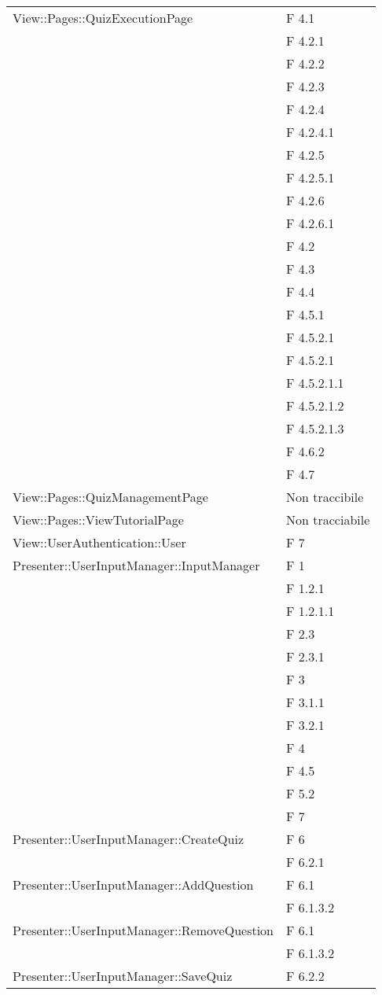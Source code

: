 \begin{longtable}{p{}p{}}
\midrule
View::Pages::QuizExecutionPage
								& F 4.1\\
								& F 4.2.1\\
								& F 4.2.2\\
								& F 4.2.3\\
								& F 4.2.4\\
								& F 4.2.4.1\\
								& F 4.2.5\\
								& F 4.2.5.1\\
								& F 4.2.6\\
								& F 4.2.6.1\\
								& F 4.2\\
								& F 4.3\\
								& F 4.4\\
								& F 4.5.1\\
								& F 4.5.2.1\\
								& F 4.5.2.1\\
								& F 4.5.2.1.1\\
								& F 4.5.2.1.2\\
								& F 4.5.2.1.3\\
								& F 4.6.2\\
								& F 4.7\\
\midrule
View::Pages::QuizManagementPage	& Non traccibile\\
\midrule
View::Pages::ViewTutorialPage	& Non tracciabile\\
\midrule
View::UserAuthentication::User	& F 7\\
\midrule
Presenter::UserInputManager::InputManager	& F 1\\
											& F 1.2.1\\
											& F 1.2.1.1\\
											& F 2.3\\
											& F 2.3.1\\
											& F 3\\
											& F 3.1.1\\
											& F 3.2.1\\
											& F 4\\
											& F 4.5\\
											& F 5.2\\
											& F 7\\
\midrule

Presenter::UserInputManager::CreateQuiz		& F 6\\
											& F 6.2.1\\
\midrule
Presenter::UserInputManager::AddQuestion	& F 6.1\\
											& F 6.1.3.2\\
\midrule
Presenter::UserInputManager::RemoveQuestion	& F 6.1\\
											& F 6.1.3.2\\
\midrule
Presenter::UserInputManager::SaveQuiz		& F 6.2.2\\


\end{longtable}
